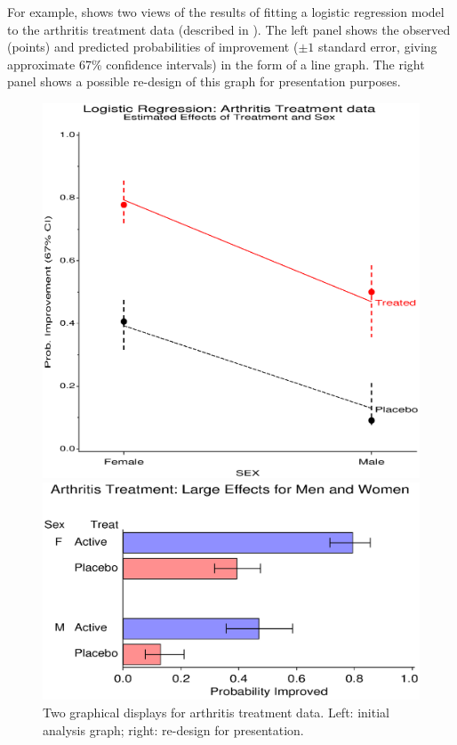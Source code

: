 For example,  shows two views of the results
of fitting a logistic regression model to the arthritis treatment
data (described in ).
The left panel shows the observed (points) and predicted probabilities of
improvement ($\pm 1$ standard error, giving approximate 67\%
confidence intervals) in the form of a line graph.
The right panel shows a possible re-design of this graph for presentation
purposes.
\begin{figure}[htb]
 \begin{minipage}[c]{.49\linewidth}
  \includegraphics[width=1\linewidth]{ch6/fig/glogist11}
 \end{minipage}%
 \hfill
 \begin{minipage}[c]{.49\linewidth}
  \includegraphics[width=1\linewidth,clip]{ch1/fig/glogist00}
 \end{minipage}
 \caption[Two graphical displays for arthritis treatment data]{Two graphical displays for arthritis treatment data. Left: initial analysis graph; right: re-design for presentation.}\label{fig:glogist00}
\end{figure}

